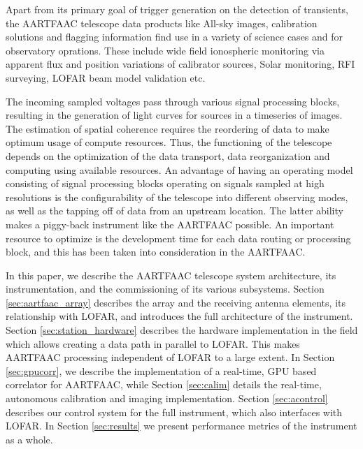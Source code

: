 \documentclass{ws-jai}
\begin{document}
Apart  from  its  primary  goal  of  trigger  generation  on  the  detection  of
transients,  the   AARTFAAC  telescope   data  products  like   All-sky  images,
calibration solutions and flagging information find  use in a variety of science
cases  and for  observatory  oprations.  These  include  wide field  ionospheric
monitoring  via apparent  flux and  position variations  of calibrator  sources,
Solar monitoring, RFI surveying, LOFAR beam model validation etc.

The incoming  sampled voltages  pass through  various signal  processing blocks,
resulting  in the  generation of  light curves  for sources  in a  timeseries of
images.  The estimation of spatial coherence requires the reordering of data to
make optimum usage of compute resources.  Thus, the functioning of the telescope
depends  on the  optimization of  the  data transport,  data reorganization  and
computing using available resources.  An  advantage of having an operating model
consisting  of signal  processing blocks  operating on  signals sampled  at high
resolutions is  the configurability  of the  telescope into  different observing
modes, as well as the tapping off of data from an upstream location.  The latter
ability makes a piggy-back instrument  like the AARTFAAC possible.  An important
resource to optimize is the development time for each data routing or processing
block, and this has been taken into consideration in the AARTFAAC.

In  this paper,  we describe  the  AARTFAAC telescope  system architecture,  its
instrumentation,  and  the commissioning  of  its  various subsystems.   Section
\ref{sec:aartfaac_array} describes the array and the receiving antenna elements,
its  relationship  with LOFAR,  and  introduces  the  full architecture  of  the
instrument.    Section   \ref{sec:station_hardware}   describes   the   hardware
implementation in  the field which  allows creating a  data path in  parallel to
LOFAR. This  makes AARTFAAC processing independent  of LOFAR to a  large extent.
In Section \ref{sec:gpucorr}, we describe the implementation of a real-time, GPU
based  correlator  for  AARTFAAC,  while  Section  \ref{sec:calim}  details  the
real-time,   autonomous  calibration   and   imaging  implementation.    Section
\ref{sec:acontrol} describes our  control system for the  full instrument, which
also interfaces with LOFAR.  In Section \ref{sec:results} we present performance
metrics of the instrument as a whole.
\end{document}
